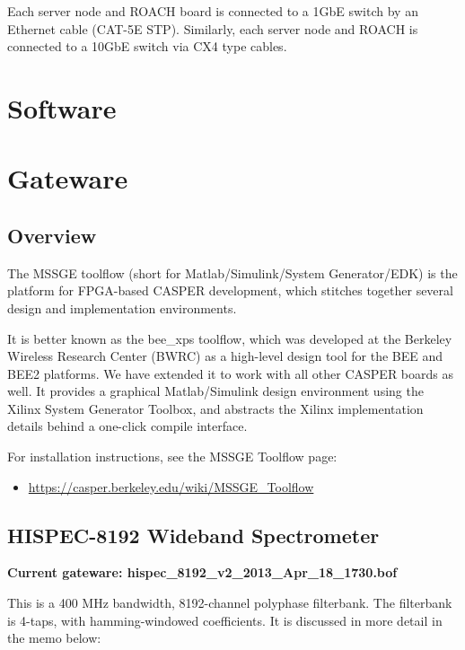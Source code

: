 \documentclass[letterpaper,10pt,english]{sphinxmanual}
\begin{document}
Each server node and ROACH board is connected to a 1GbE switch by an Ethernet cable (CAT-5E STP). Similarly, each server node and ROACH is connected to a 10GbE switch via CX4 type cables.


\chapter{Software}
\label{software:software}\label{software::doc}\label{software:software-chapter}

\chapter{Gateware}
\label{gateware::doc}\label{gateware:gateware}

\section{Overview}
\label{gateware:overview}
The MSSGE toolflow (short for Matlab/Simulink/System Generator/EDK) is the platform
for FPGA-based CASPER development, which stitches together several design and implementation
environments.

It is better known as the bee\_xps toolflow, which was developed at the Berkeley Wireless
Research Center (BWRC) as a high-level design tool for the BEE and BEE2 platforms. We have
extended it to work with all other CASPER boards as well. It provides a graphical
Matlab/Simulink design environment using the Xilinx System Generator Toolbox,
and abstracts the Xilinx implementation details behind a one-click compile interface.

For installation instructions, see the MSSGE Toolflow page:
\begin{itemize}
\item {} 
\href{https://casper.berkeley.edu/wiki/MSSGE\_Toolflow}{https://casper.berkeley.edu/wiki/MSSGE\_Toolflow}

\end{itemize}


\section{HISPEC-8192 Wideband Spectrometer}
\label{gateware:hispec-8192-wideband-spectrometer}
\textbf{Current gateware: hispec\_8192\_v2\_2013\_Apr\_18\_1730.bof}

This is a 400 MHz bandwidth, 8192-channel polyphase filterbank. The filterbank
is 4-taps, with hamming-windowed coefficients. It is discussed in more detail
in the memo below:
\end{document}
